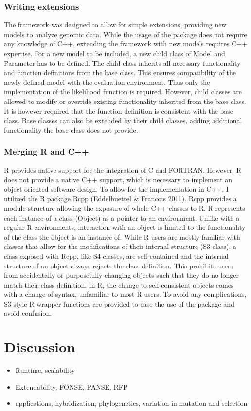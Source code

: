 \documentclass{bioinfo}
\begin{document}
\subsubsection{Writing extensions}
The framework was designed to allow for simple extensions, providing new models to analyze genomic data. 
While the usage of the package does not require any knowledge of C++, extending the framework with new models requires C++ expertise. 
For a new model to be included, a new child class of Model and Parameter has to be defined.
The child class inherits all necessary functionality and function definitions from the base class. This ensures compatibility of the newly defined model with the evaluation environment.
Thus only the implementation of the likelihood function is required. 
However, child classes are allowed to modify or override existing functionality inherited from the base class. 
It is however required that the function definition is consistent with the base class. 
Base classes can also be extended by their child classes, adding additional functionality the base class does not provide.
\subsubsection{Merging R and C++}
R provides native support for the integration of C and FORTRAN. 
However, R does not provide a native C++ support, which is necessary to implement an object oriented software design. 
To allow for the implementation in C++, I utilized the R package Rcpp (Eddelbuettel \& Francois 2011). 
Rcpp provides a module structure allowing the exposure of whole C++ classes to R. 
R represents each instance of a class (Object) as a pointer to an environment. 
Unlike with a regular R environments, interaction with an object is limited to the functionality of the class the object is an instance of.
While R users are mostly familiar with classes that allow for the modifications of their internal structure (S3 class), a class exposed with Rcpp, like S4 classes, are self-contained and the internal structure of an object always rejects the class definition. 
This prohibits users from accidentally or purposefully changing objects such that they do no longer match their class definition.
In R, the change to self-consistent objects comes with a change of syntax, unfamiliar to most R users. 
To avoid any complications, S3 style R wrapper functions are provided to ease the use of the package and avoid confusion.

\section*{Discussion}
\begin{itemize}
\item Runtime, scalability
\item Extendability, FONSE, PANSE, RFP
\item applications, hybridization, phylogenetics, variation in mutation and selection
\end{itemize}



%
%
\end{document}
